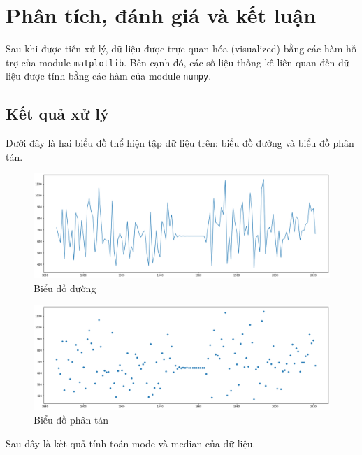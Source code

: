 \documentclass[a4paper]{article}
\begin{document}
\section{Phân tích, đánh giá và kết luận}
Sau khi được tiền xử lý, dữ liệu được trực quan hóa (visualized) bằng các hàm hỗ trợ của module \lstinline{matplotlib}. Bên cạnh đó, các số liệu thống kê liên quan đến dữ liệu được tính bằng các hàm của module \lstinline{numpy}.
\subsection{Kết quả xử lý}
Dưới đây là hai biểu đồ thể hiện tập dữ liệu trên: biểu đồ đường và biểu đồ phân tán.
\begin{center}
\begin{figure}[H]
\includegraphics[scale=0.45]{images/line.png}
\caption{Biểu đồ đường}
\end{figure}

\begin{figure}[H]
\includegraphics[scale=0.45]{images/scatterplot.png}
\caption{Biểu đồ phân tán}
\end{figure}

\end{center}
Sau đây là kết quả tính toán mode và median của dữ liệu.
\end{document}
